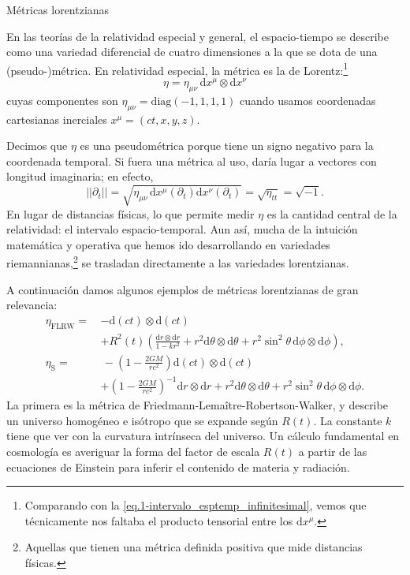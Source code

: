 \begin{example}
    {Métricas lorentzianas
    \label{ej.3-metricas_lorentzianas}}
    
    En las teorías de la relatividad especial y general, el espacio-tiempo se describe como una variedad diferencial de cuatro dimensiones a la que se dota de una (pseudo-)métrica. En relatividad especial, la métrica es la de Lorentz:\footnote{Comparando con la \cref{eq.1-intervalo_esptemp_infinitesimal}, vemos que técnicamente nos faltaba el producto tensorial entre los \(\mathrm{d}x^\mu\).} 
    \begin{equation*}
        \eta = \eta_{\mu\nu}\, \mathrm{d}x^\mu\otimes\mathrm{d}x^\nu
    \end{equation*}
    cuyas componentes son \(\eta_{\mu\nu} = \text{diag}(-1, 1, 1, 1)\) cuando usamos coordenadas cartesianas inerciales \(x^\mu = (ct, x, y, z)\).

    Decimos que \(\eta\) es una pseudométrica porque tiene un signo negativo para la coordenada temporal. Si fuera una métrica al uso, daría lugar a vectores con longitud imaginaria; en efecto,
    \begin{equation*}
        ||\partial_t|| = \sqrt{\eta_{\mu\nu}\,\mathrm{d}x^\mu(\partial_t)\mathrm{d}x^\nu(\partial_t)} =  \sqrt{\eta_{tt}} = \sqrt{-1}.
    \end{equation*}
    En lugar de distancias físicas, lo que permite medir \(\eta\) es la cantidad central de la relatividad: el intervalo espacio-temporal. Aun así, mucha de la intuición matemática y operativa que hemos ido desarrollando en variedades riemannianas,\footnote{Aquellas que tienen una métrica definida positiva que mide distancias físicas.} se trasladan directamente a las variedades lorentzianas.

    A continuación damos algunos ejemplos de métricas lorentzianas de gran relevancia:
    \begin{align*}
        \eta_\text{FLRW} =\,& -\mathrm{d}(ct)\otimes\mathrm{d}(ct) \\
        &+ R^2(t)\left(\frac{\mathrm{d}r\otimes\mathrm{d}r}{1-kr^2} + r^2 \mathrm{d}\theta\otimes\mathrm{d}\theta + r^2\sin^2\theta\, \mathrm{d}\phi\otimes\mathrm{d}\phi \right),\\
        \eta_\text{S} =&\, -\left(1-\frac{2GM}{rc^2}\right)\mathrm{d}(ct)\otimes\mathrm{d}(ct) \\
        &+\left(1-\frac{2GM}{rc^2}\right)^{-1}\mathrm{d}r\otimes\mathrm{d}r +r^2 \mathrm{d}\theta\otimes\mathrm{d}\theta + r^2\sin^2\theta\, \mathrm{d}\phi\otimes\mathrm{d}\phi.
    \end{align*}
    La primera es la métrica de Friedmann-Lema\^{i}tre-Robertson-Walker, y describe un universo homogéneo e isótropo que se expande según \(R(t)\). La constante \(k\) tiene que ver con la curvatura intrínseca del universo. Un cálculo fundamental en cosmología es averiguar la forma del factor de escala \(R(t)\) a partir de las ecuaciones de Einstein para inferir el contenido de materia y radiación. 
    

\end{example}
